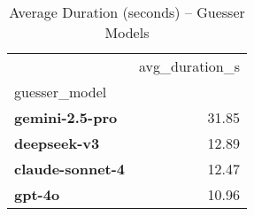 \begin{table}
\caption{Average Duration (seconds) – Guesser Models}
\label{tab:Core-300_AvgDuration_by_Guesser}
\begin{tabular}{lr}
\toprule
 & avg_duration_s \\
guesser_model &  \\
\midrule
\textbf{gemini-2.5-pro} & 31.85 \\
\textbf{deepseek-v3} & 12.89 \\
\textbf{claude-sonnet-4} & 12.47 \\
\textbf{gpt-4o} & 10.96 \\
\bottomrule
\end{tabular}
\end{table}
